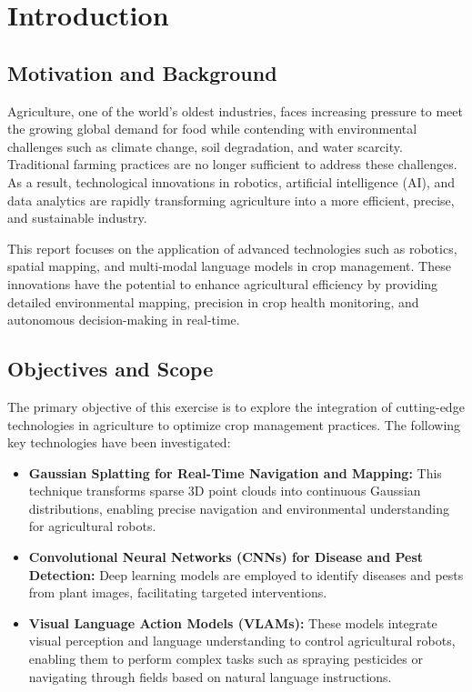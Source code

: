 \chapter{Introduction}

\section{Motivation and Background}
Agriculture, one of the world's oldest industries, faces increasing pressure to meet the growing global demand for food while contending with environmental challenges such as climate change, soil degradation, and water scarcity. \cite{duckett2018agriculturalroboticsfuturerobotic} Traditional farming practices are no longer sufficient to address these challenges. As a result, technological innovations in robotics, artificial intelligence (AI), and data analytics are rapidly transforming agriculture into a more efficient, precise, and sustainable industry. 

This report focuses on the application of advanced technologies such as robotics, spatial mapping, and multi-modal language models in crop management. These innovations have the potential to enhance agricultural efficiency by providing detailed environmental mapping, precision in crop health monitoring, and autonomous decision-making in real-time.

\section{Objectives and Scope}
The primary objective of this exercise is to explore the integration of cutting-edge technologies in agriculture to optimize crop management practices. The following key technologies have been investigated:
\begin{itemize}
    \item \textbf{Gaussian Splatting for Real-Time Navigation and Mapping:} This technique transforms sparse 3D point clouds into continuous Gaussian distributions, enabling precise navigation and environmental understanding for agricultural robots.\cite{chen2024splatnavsaferealtimerobot}
    \item \textbf{Convolutional Neural Networks (CNNs) for Disease and Pest Detection:} Deep learning models are employed to identify diseases and pests from plant images, facilitating targeted interventions.\cite{10353343}
    \item \textbf{Visual Language Action Models (VLAMs):} These models integrate visual perception and language understanding to control agricultural robots, enabling them to perform complex tasks such as spraying pesticides or navigating through fields based on natural language instructions.
\end{itemize}


